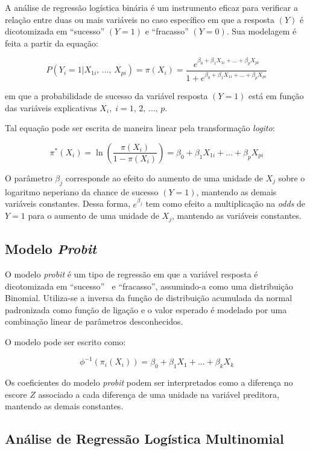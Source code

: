 \documentclass[
]{estat/estat}
\begin{document}
A análise de regressão logística binária é um instrumento eficaz para
verificar a relação entre duas ou mais variáveis no caso específico em
que a resposta \((Y)\) é dicotomizada em ``sucesso'' \((Y=1)\) e
``fracasso'' \((Y=0)\). Sua modelagem é feita a partir da equação:

\[
P(Y_i = 1|X_{1i}, \, \ldots , \, X_{pi}) = \pi(X_i)= \frac{e^{\beta_0 + \beta_1 X_{1i} + \ldots + \beta_p X_{pi}}}{1 + e^{\beta_0 + \beta_1 X_{1i} + \ldots + \beta_p X_{pi}}}
\]

em que a probabilidade de sucesso da variável resposta \((Y=1)\) está em
função das variáveis explicativas \(X_i,\; i=1,\, 2, \, \ldots , \,p\).

Tal equação pode ser escrita de maneira linear pela transformação
\emph{logito}:

\[
\pi^*(X_i)=\ln\left(\frac{\pi(X_i)}{1-\pi(X_i)}\right)=\beta_0+\beta_1X_{1i}+ \ldots +\beta_pX_{pi}
\]

O parâmetro \(\beta_{j}\) corresponde ao efeito do aumento de uma
unidade de \(X_{j}\) sobre o logaritmo neperiano da chance de sucesso
\((Y=1)\), mantendo as demais variáveis constantes. Dessa forma,
\(\displaystyle e^{\beta_j}\) tem como efeito a multiplicação na
\emph{odds} de \(Y=1\) para o aumento de uma unidade de \(X_{j}\),
mantendo as variáveis constantes.

\subsection{\texorpdfstring{Modelo
\emph{Probit}}{Modelo Probit}}\label{modelo-probit}

O modelo \emph{probit} é um tipo de regressão em que a variável resposta
é dicotomizada em ``sucesso'' \(\:\) e ``fracasso'', assumindo-a como
uma distribuição Binomial. Utiliza-se a inversa da função de
distribuição acumulada da normal padronizada como função de ligação e o
valor esperado é modelado por uma combinação linear de parâmetros
desconhecidos.

O modelo pode ser escrito como:

\[ \phi^{-1}(\pi_i(X_i))=\beta_0+\beta_1X_1+...+\beta_kX_k \]

Os coeficientes do modelo \emph{probit} podem ser interpretados como a
diferença no escore \(Z\) associado a cada diferença de uma unidade na
variável preditora, mantendo as demais constantes.

\subsection{Análise de Regressão Logística
Multinomial}\label{anuxe1lise-de-regressuxe3o-loguxedstica-multinomial}
\end{document}
